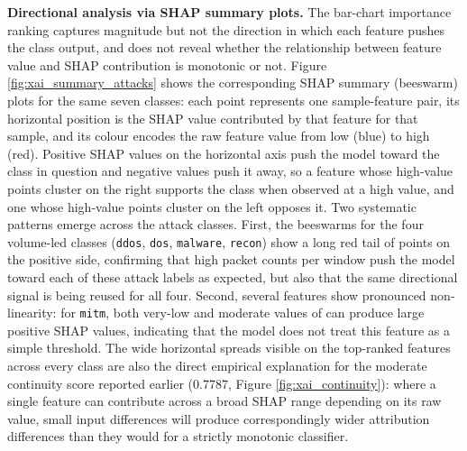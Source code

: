 \textbf{Directional analysis via SHAP summary plots.} The bar-chart importance ranking captures magnitude but not the direction in which each feature pushes the class output, and does not reveal whether the relationship between feature value and SHAP contribution is monotonic or not. Figure \ref{fig:xai_summary_attacks} shows the corresponding SHAP summary (beeswarm) plots for the same seven classes: each point represents one sample-feature pair, its horizontal position is the SHAP value contributed by that feature for that sample, and its colour encodes the raw feature value from low (blue) to high (red). Positive SHAP values on the horizontal axis push the model toward the class in question and negative values push it away, so a feature whose high-value points cluster on the right supports the class when observed at a high value, and one whose high-value points cluster on the left opposes it. Two systematic patterns emerge across the attack classes. First, the beeswarms for the four volume-led classes (\texttt{ddos}, \texttt{dos}, \texttt{malware}, \texttt{recon}) show a long red tail of  points on the positive side, confirming that high packet counts per window push the model toward each of these attack labels as expected, but also that the same directional signal is being reused for all four. Second, several features show pronounced non-linearity: for \texttt{mitm}, both very-low and moderate values of  can produce large positive SHAP values, indicating that the model does not treat this feature as a simple threshold. The wide horizontal spreads visible on the top-ranked features across every class are also the direct empirical explanation for the moderate continuity score reported earlier (0.7787, Figure \ref{fig:xai_continuity}): where a single feature can contribute across a broad SHAP range depending on its raw value, small input differences will produce correspondingly wider attribution differences than they would for a strictly monotonic classifier.

